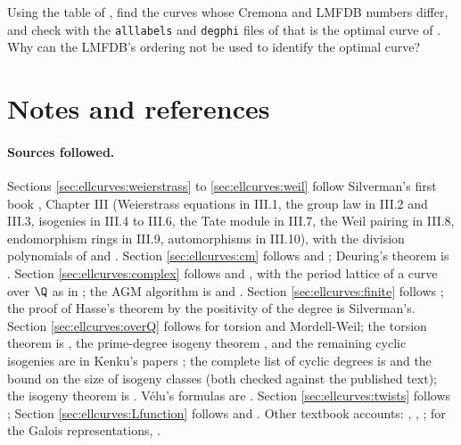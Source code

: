 \begin{exercise}\label{ex:ellcurves:ex-labels}
Using the table of , find the curves whose Cremona and LMFDB numbers differ, and check with the \texttt{alllabels} and \texttt{degphi} files of \cite{ecdata} that
 is the optimal curve of . Why can the LMFDB's ordering not be used to identify the optimal curve?
\end{exercise}

\section{Notes and references}\label{sec:ellcurves:notes}

\paragraph{Sources followed.} Sections \ref{sec:ellcurves:weierstrass} to \ref{sec:ellcurves:weil} follow Silverman's first book \cite{SilvermanAEC}, Chapter III (Weierstrass equations in III.1,
the group law in III.2 and III.3, isogenies in III.4 to III.6, the Tate module in III.7, the Weil pairing in III.8, endomorphism rings in III.9, automorphisms in III.10), with the division
polynomials of \cite[Exercise 3.7]{SilvermanAEC} and \cite[Chapter 3]{WashingtonEC}. Section \ref{sec:ellcurves:cm} follows \cite[Chapter II]{SilvermanATAEC} and \cite{Cox}; Deuring's theorem is
\cite{Deuring41}. Section \ref{sec:ellcurves:complex} follows \cite[Chapter VI]{SilvermanAEC} and \cite[Chapter 1]{DiamondShurman}, with the period lattice of a curve over $\Q$ as in
\cite[Chapter III]{Cremona97}; the AGM algorithm is \cite[Section 3.7]{Cremona97} and \cite[Section 7.4]{Cohen93}. Section \ref{sec:ellcurves:finite} follows \cite[Chapter V]{SilvermanAEC}; the
proof of Hasse's theorem by the positivity of the degree is Silverman's. Section \ref{sec:ellcurves:overQ} follows \cite[Chapters VII and VIII]{SilvermanAEC} for torsion and Mordell-Weil;
the torsion theorem is \cite{Mazur77}, the prime-degree isogeny theorem \cite{Mazur78}, and the remaining cyclic isogenies are in Kenku's papers \cite{Kenku79,Kenku80a,Kenku80b,Kenku81}; the
complete list of cyclic degrees is \cite[Theorem 1]{Kenku} and the bound on the size of isogeny classes \cite[Theorem 2]{Kenku} (both checked against the published text); the isogeny theorem is \cite{Faltings83}. V\'elu's formulas are \cite{Velu71}. Section \ref{sec:ellcurves:twists} follows
\cite[Section X.2 and X.5]{SilvermanAEC}; Section \ref{sec:ellcurves:Lfunction} follows \cite[Appendix C, Section 16]{SilvermanAEC} and \cite[Chapter II]{Cremona97}. Other textbook accounts:
\cite{Husemoller}, \cite{Knapp}, \cite{MilneEC}; for the Galois representations, \cite[Chapter I]{SerreAbelian}.

